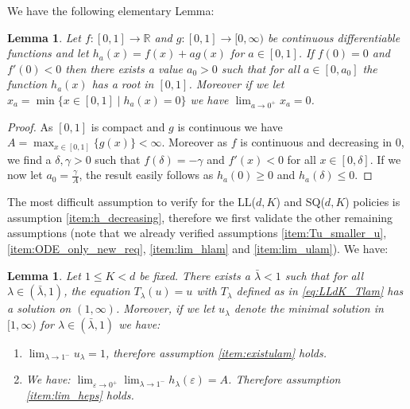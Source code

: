 \documentclass[12pt]{report}
\newtheorem{lemma}[theorem]{Lemma}
\begin{document}
We have the following elementary Lemma:
\begin{lemma}\label{lem:fplusag}
Let $f: [0,1] \rightarrow \mathbb{R}$ and $g:[0,1]\rightarrow [0,\infty)$ be continuous differentiable functions and let $h_a(x)=f(x)+ag(x)$ for $a \in [0,1]$. If $f(0)=0$ and $f'(0)<0$ then there exists a value $a_0>0$ such that for all $a \in [0,a_0]$ the function $h_a(x)$ has a root in $[0,1]$. Moreover if we let $x_a = \min\{x \in [0,1] \mid h_a(x)=0\}$ we have $\lim_{a\rightarrow 0^+}x_a = 0$.
\end{lemma}
\begin{proof}
As $[0,1]$ is compact and $g$ is continuous we have $A= \max_{x\in [0,1]} \{ g(x) \}<\infty$. Moreover as $f$ is continuous and decreasing in $0$, we find a $\delta, \gamma > 0$ such that $f(\delta)=-\gamma$ and $f'(x)<0$ for all $x\in [0,\delta]$. If we now let $a_0 = \frac{\gamma}{A}$, the result easily follows
as $h_a(0) \geq 0$ and $h_a(\delta) \leq 0$.
\end{proof}
The most difficult assumption to verify for the LL($d,K$) and SQ($d,K$) policies is assumption \ref{item:h_decreasing}, therefore we first validate the other remaining assumptions (note that we already verified assumptions \ref{item:Tu_smaller_u}, \ref{item:ODE_only_new_req}, \ref{item:lim_hlam} and \ref{item:lim_ulam}). We have:
\begin{lemma}\label{lem:SQdk1}
Let $1\leq K < d$ be fixed. There exists a $\bar \lambda < 1$ such that for all $\lambda \in (\bar \lambda, 1)$, the equation $T_\lambda(u)=u$ with $T_\lambda$ defined as in \eqref{eq:LLdK_Tlam} has a solution on $(1,\infty)$. Moreover, if we let $u_{\lambda}$ denote the minimal solution in $[1,\infty)$ for $\lambda \in (\bar \lambda,1)$ we have:
\begin{enumerate}[label=(\alph*), leftmargin=*]
\item $\lim_{\lambda \rightarrow 1^-} u_{\lambda} = 1$, therefore assumption \ref{item:existulam} holds. \label{enum:SQdK1}
\item We have: $\lim_{\varepsilon \rightarrow 0^+} \lim_{\lambda \rightarrow 1^-} h_\lambda(\varepsilon) = A$. Therefore assumption \ref{item:lim_heps} holds. \label{enum:ulamdK8}
\end{enumerate}
\end{lemma}
\end{document}
